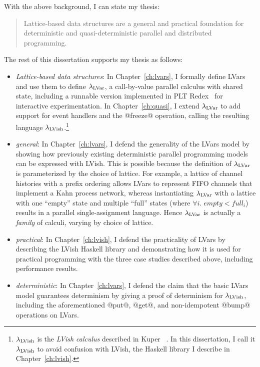 With the above background, I can state my thesis:
\begin{quote}
  Lattice-based data structures are a general and practical foundation
  for deterministic and quasi-deterministic parallel and distributed
  programming.
\end{quote}
The rest of this dissertation supports my thesis as follows:
\begin{itemize}
  \item \emph{Lattice-based data structures}: In
    Chapter~\ref{ch:lvars}, I formally define LVars and use them to
    define $\lambda_{\textrm{LVar}}$, a call-by-value parallel calculus with
    shared state, including a runnable version implemented in PLT
    Redex~\cite{redex-book} for interactive experimentation.  In
    Chapter~\ref{ch:quasi}, I extend $\lambda_{\textrm{LVar}}$ to add support for
    event handlers and the @freeze@ operation, calling the resulting
    language $\lambda_{\textrm{LVish}}$.\footnote{$\lambda_{\textrm{LVish}}$ is the
      \emph{LVish calculus} described in Kuper
      \etal~\cite{Freeze-paper}.  In this dissertation, I call it
      $\lambda_{\textrm{LVish}}$ to avoid confusion with LVish, the Haskell
      library I describe in Chapter~\ref{ch:lvish}.}

  \item \emph{general}: In Chapter~\ref{ch:lvars}, I defend the
    generality of the LVars model by showing how previously existing
    deterministic parallel programming models can be expressed with
    LVish.  This is possible because the definition of $\lambda_{\textrm{LVar}}$
    is parameterized by the choice of lattice.  For example, a lattice
    of channel histories with a prefix ordering allows LVars to
    represent FIFO channels that implement a Kahn process network,
    whereas instantiating $\lambda_{\textrm{LVar}}$ with a lattice with one
    ``empty'' state and multiple ``full'' states (where $\forall{i}.\;
    \mathit{empty} < \mathit{full_i}$) results in a parallel
    single-assignment language.  Hence $\lambda_{\textrm{LVar}}$ is actually a
    \emph{family} of calculi, varying by choice of lattice.

  \item \emph{practical}: In Chapter~\ref{ch:lvish}, I defend the
    practicality of LVars by describing the LVish Haskell library and
    demonstrating how it is used for practical programming with the
    three case studies described above, including performance results.

  \item \emph{deterministic}: In Chapter~\ref{ch:lvars}, I defend the
    claim that the basic LVars model guarantees determinism by giving
    a proof of determinism for $\lambda_{\textrm{LVish}}$, including the
    aforementioned @put@, @get@, and non-idempotent @bump@ operations
    on LVars.


\end{itemize}
